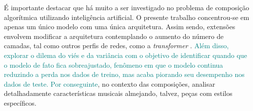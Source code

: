 \documentclass[twoside]{automatextcc}
\newcommand{\nico}[1]{\textcolor{teal}{#1}}
\begin{document}
É importante destacar que há muito a ser investigado no problema de composição algorítmica utilizando inteligência artificial. O presente trabalho concentrou-se em apenas um único modelo com uma única arquitetura. Assim sendo, extensões envolvem modificar a arquitetura contemplando o aumento do número de camadas, tal como outros perfis de redes, como a \textit{transformer} \citep{vaswani2017}. \nico{Além disso, explorar o dilema do viés e da variância com o objetivo de identificar quando que o modelo de fato fica sobreajustado, fenômeno em que o modelo continua reduzindo a perda nos dados de treino, mas acaba piorando seu desempenho nos dados de teste. Por conseguinte},  no contexto das composições, analisar detalhadamente características musicais almejando, talvez, peças com estilos específicos.







\end{document}
